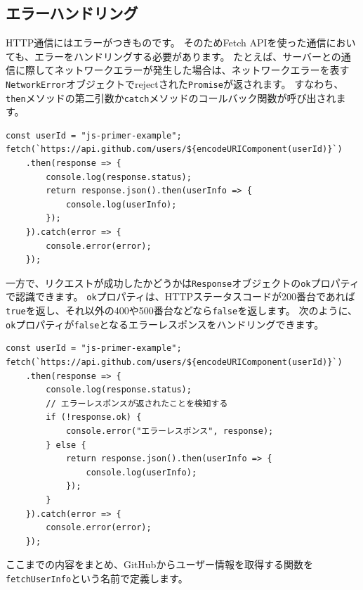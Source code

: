 \hypertarget{error-handling}{%
\subsection{エラーハンドリング}\label{error-handling}}

HTTP通信にはエラーがつきものです。 そのためFetch
APIを使った通信においても、エラーをハンドリングする必要があります。
たとえば、サーバーとの通信に際してネットワークエラーが発生した場合は、ネットワークエラーを表す\texttt{NetworkError}オブジェクトでrejectされた\texttt{Promise}が返されます。
すなわち、\texttt{then}メソッドの第二引数か\texttt{catch}メソッドのコールバック関数が呼び出されます。

\begin{lstlisting}
const userId = "js-primer-example";
fetch(`https://api.github.com/users/${encodeURIComponent(userId)}`)
    .then(response => {
        console.log(response.status);
        return response.json().then(userInfo => {
            console.log(userInfo);
        });
    }).catch(error => {
        console.error(error);
    });
\end{lstlisting}

一方で、リクエストが成功したかどうかは\texttt{Response}オブジェクトの\texttt{ok}プロパティで認識できます。
\texttt{ok}プロパティは、HTTPステータスコードが200番台であれば\texttt{true}を返し、それ以外の400や500番台などなら\texttt{false}を返します。
次のように、\texttt{ok}プロパティが\texttt{false}となるエラーレスポンスをハンドリングできます。

\begin{lstlisting}
const userId = "js-primer-example";
fetch(`https://api.github.com/users/${encodeURIComponent(userId)}`)
    .then(response => {
        console.log(response.status); 
        // エラーレスポンスが返されたことを検知する
        if (!response.ok) {
            console.error("エラーレスポンス", response);
        } else {
            return response.json().then(userInfo => {
                console.log(userInfo);
            });
        }
    }).catch(error => {
        console.error(error);
    });
\end{lstlisting}

\enlargethispage{\baselineskip}ここまでの内容をまとめ、GitHubからユーザー情報を取得する関数を\texttt{fetchUserInfo}という名前で定義します。



